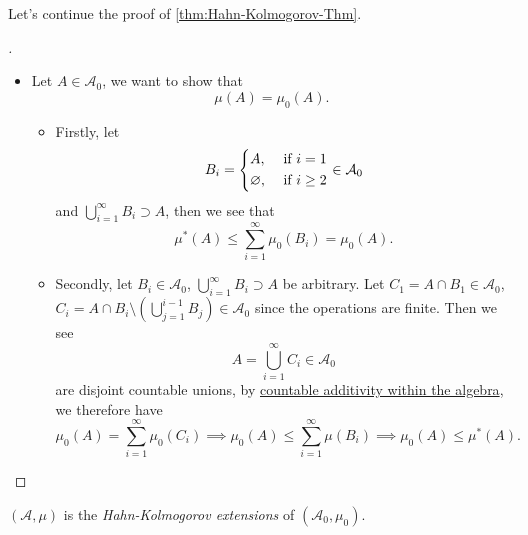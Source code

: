 Let's continue the proof of \autoref{thm:Hahn-Kolmogorov-Thm}.
\begin{proof}[\unskip\nopunct]\label{pf:Hahn-Kolmogorov-Thm-cont}
	\begin{itemize}
		\item Let \(A\in \mathcal{A} _0\), we want to show that
		      \[
			      \mu (A) = \mu_0(A).
		      \]
		      \begin{itemize}
			      \item Firstly, let
			            \[
				            B_{i} = \begin{dcases}
					            A,            & \text{ if } i= 1    \\
					            \varnothing , & \text{ if } i\geq 2
				            \end{dcases}\in \mathcal{A} _0
			            \]
			            and \(\bigcup\limits_{i=1}^{\infty} B_{i}\supset A\), then we see that
			            \[
				            \mu ^{*} (A)\leq \sum\limits_{i=1}^{\infty} \mu _0(B_{i}) = \mu _0(A).
			            \]
			      \item Secondly, let \(B_{i}\in \mathcal{A} _0\), \(\bigcup\limits_{i=1}^{\infty} B_{i}\supset A\) be arbitrary.
			            Let \(C_1 = A\cap B_1\in \mathcal{A} _0\), \(C_{i} = A\cap B_{i}\setminus \left(\bigcup\limits_{j=1}^{i-1} B_{j}\right)\in \mathcal{A} _0\)
			            since the operations are finite. Then we see
			            \[
				            A = \bigcup\limits_{i=1}^{\infty} C_{i}\in \mathcal{A} _0
			            \]
			            are disjoint countable unions, by \hyperref[def:pre-measure-countable-additivity-within-the-algebra]{countable additivity within the algebra},
			            we therefore have
			            \[
				            \mu _0(A) = \sum\limits_{i=1}^{\infty} \mu _0(C_{i}) \implies \mu _0(A) \leq \sum\limits_{i=1}^{\infty} \mu (B_{i})\implies \mu _0(A)\leq \mu ^{*} (A).
			            \]
		      \end{itemize}
	\end{itemize}
\end{proof}

\begin{definition}[HK extension]
	\((\mathcal{A} , \mu )\) is the \emph{Hahn-Kolmogorov extensions} of \((\mathcal{A} _0, \mu _0)\).
\end{definition}

